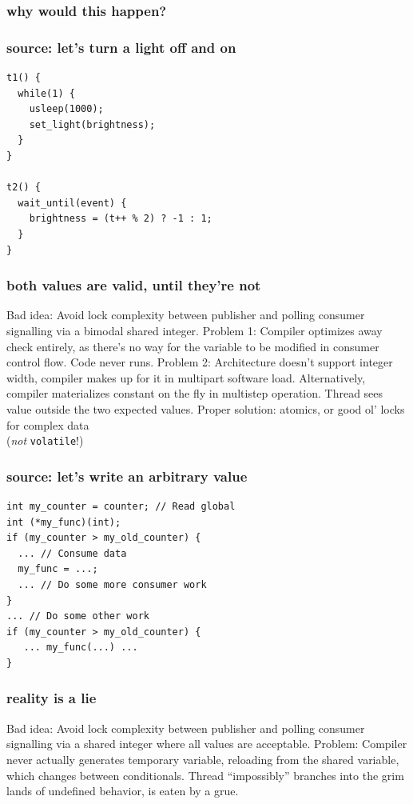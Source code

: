 \documentclass{beamer}
\begin{document}
\begin{frame}
\frametitle{why would this happen?}
\end{frame}

\begin{frame}[fragile]
\frametitle{source: let's turn a light off and on}
\begin{lstlisting}
t1() {
  while(1) {
    usleep(1000);
    set_light(brightness);
  }
}

t2() {
  wait_until(event) {
    brightness = (t++ % 2) ? -1 : 1;
  }
}
\end{lstlisting}
\end{frame}

\begin{frame}
\frametitle{both values are valid, until they're not}
Bad idea: Avoid lock complexity between publisher and polling consumer signalling via a bimodal shared integer.
\vfill
Problem 1: Compiler optimizes away check entirely, as there's no way for the variable to be modified in consumer control flow. Code never runs.
\vfill
Problem 2: Architecture doesn't support integer width, compiler makes up for it in multipart software load. Alternatively, compiler materializes constant on the fly in multistep operation. Thread sees value outside the two expected values.
\vfill
Proper solution: atomics, or good ol' locks for complex data\\
  (\textit{not} \texttt{volatile}!)
\end{frame}

\begin{frame}[fragile]
\frametitle{source: let's write an arbitrary value}
\begin{lstlisting}
int my_counter = counter; // Read global
int (*my_func)(int);
if (my_counter > my_old_counter) {
  ... // Consume data
  my_func = ...;
  ... // Do some more consumer work
}
... // Do some other work
if (my_counter > my_old_counter) {
   ... my_func(...) ...
}
\end{lstlisting}
\end{frame}

\begin{frame}
\frametitle{reality is a lie}
Bad idea: Avoid lock complexity between publisher and polling consumer signalling via a shared integer where all values are acceptable.
\vfill
Problem: Compiler never actually generates temporary variable, reloading from the shared variable, which changes between conditionals. Thread ``impossibly'' branches into the grim lands of undefined behavior, is eaten by a grue.
\end{frame}
\end{document}
